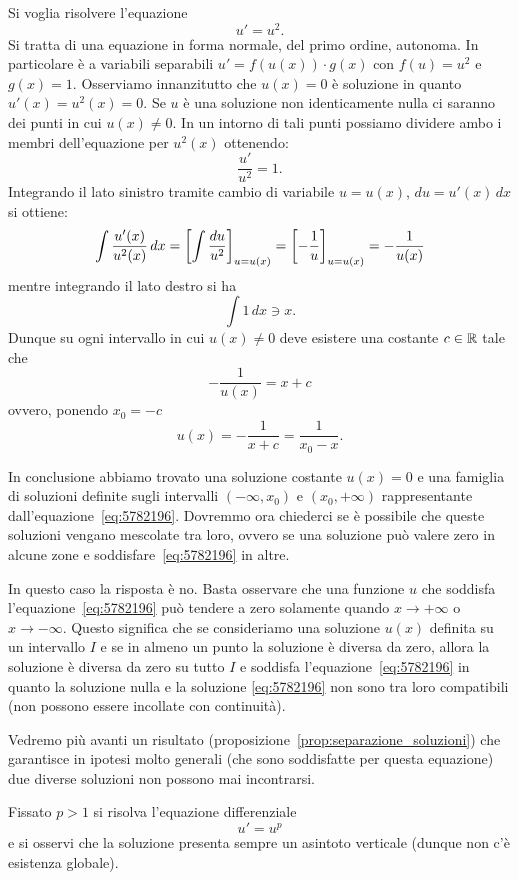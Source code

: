 \begin{example}
Si voglia risolvere l'equazione
\[
  u' = u^2.
\]
Si tratta di una equazione in forma normale, del primo ordine, autonoma.
In particolare è a variabili separabili
$u' = f(u(x))\cdot g(x)$
con $f(u)=u^2$ e $g(x)=1$.
Osserviamo innanzitutto che $u(x) = 0$ è soluzione in quanto $u'(x) = u^2(x) = 0$.
Se $u$ è una soluzione non identicamente nulla ci saranno dei punti in cui
$u(x)\neq 0$.
In un intorno di tali punti possiamo dividere ambo i membri dell'equazione per $u^2(x)$ ottenendo:
\[
  \frac{u'}{u^2} = 1.
\]
Integrando il lato sinistro tramite cambio di variabile $u=u(x)$, $du=u'(x)\, dx$ si ottiene:
\[
  \int \frac{u'(x)}{u^2(x)}\, dx = {\left[ \int \frac{du}{u^2} \right]}_{u=u(x)} = {\left[ -\frac{1}{u} \right]}_{u=u(x)}
  = -\frac{1}{u(x)}
\]
mentre integrando il lato destro si ha
\[
  \int 1 \, dx \ni x.
\]
Dunque su ogni intervallo in cui $u(x)\neq 0$ deve esistere una costante $c\in {\mathbb R}$ tale che
\[
-\frac{1}{u(x)} = x + c
\]
ovvero, ponendo $x_0 = -c$
\begin{equation}\label{eq:5782196}
  u(x) = -\frac{1}{x+c} = \frac{1}{x_0-x}.
\end{equation}

In conclusione abbiamo trovato una soluzione costante $u(x)=0$ e una famiglia
di soluzioni definite sugli intervalli $(-\infty,x_0)$ e $(x_0,+\infty)$
rappresentante dall'equazione~\eqref{eq:5782196}.
Dovremmo ora chiederci
se è possibile che queste soluzioni vengano mescolate tra loro, ovvero
se una soluzione può valere zero in alcune zone e soddisfare~\eqref{eq:5782196}
in altre.

In questo caso la risposta è no.
Basta osservare che una funzione $u$ che soddisfa l'equazione~\eqref{eq:5782196}
può tendere a zero solamente quando $x\to +\infty$ o $x\to -\infty$.
Questo significa che se consideriamo una soluzione $u(x)$
definita su un intervallo $I$ e se in almeno un punto la soluzione è diversa da zero,
allora la soluzione è diversa da zero su tutto $I$ e
soddisfa l'equazione~\eqref{eq:5782196} in quanto la soluzione nulla e la
soluzione \eqref{eq:5782196} non sono tra loro compatibili (non possono essere
incollate con continuità).

Vedremo più avanti un risultato
(proposizione~\ref{prop:separazione_soluzioni})
che garantisce in ipotesi molto generali (che sono soddisfatte per questa
equazione) due diverse soluzioni non
possono mai incontrarsi.
\end{example}

\begin{exercise}
Fissato $p>1$ si risolva l'equazione differenziale
\[
  u' = u^p
\]
e si osservi che la soluzione presenta sempre un asintoto verticale
(dunque non c'è esistenza globale).
\end{exercise}

